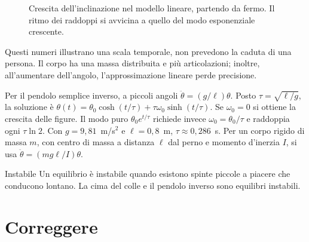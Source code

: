 \documentclass[11pt,a4paper,twoside=false,headinclude,footinclude]{scrartcl}
\begin{document}
\begin{figure}[htbp]
\centering
{}
\caption{Crescita dell'inclinazione nel modello lineare, partendo da fermo. Il ritmo dei raddoppi si avvicina a quello del modo esponenziale crescente.}
\label{fig:raddoppio}
\end{figure}

Questi numeri illustrano una scala temporale, non prevedono la caduta di una persona. Il corpo ha una massa distribuita e più articolazioni; inoltre, all'aumentare dell'angolo, l'approssimazione lineare perde precisione.

\begin{formule}
Per il pendolo semplice inverso, a piccoli angoli $\ddot\theta=(g/\ell)\theta$. Posto $\tau=\sqrt{\ell/g}$, la soluzione è $\theta(t)=\theta_0\cosh(t/\tau)+\tau\omega_0\sinh(t/\tau)$. Se $\omega_0=0$ si ottiene la crescita delle figure. Il modo puro $\theta_0e^{t/\tau}$ richiede invece $\omega_0=\theta_0/\tau$ e raddoppia ogni $\tau\ln2$. Con $g=9{,}81$~m/s$^2$ e $\ell=0{,}8$~m, $\tau\approx0{,}286$~s. Per un corpo rigido di massa $m$, con centro di massa a distanza $\ell$ dal perno e momento d'inerzia $I$, si usa $\ddot\theta=(mg\ell/I)\theta$.
\end{formule}

\begin{parola}{Instabile}
Un equilibrio è instabile quando esistono spinte piccole a piacere che conducono lontano. La cima del colle e il pendolo inverso sono equilibri instabili.
\end{parola}

\section{Correggere}\label{sec:correggere}
\end{document}
